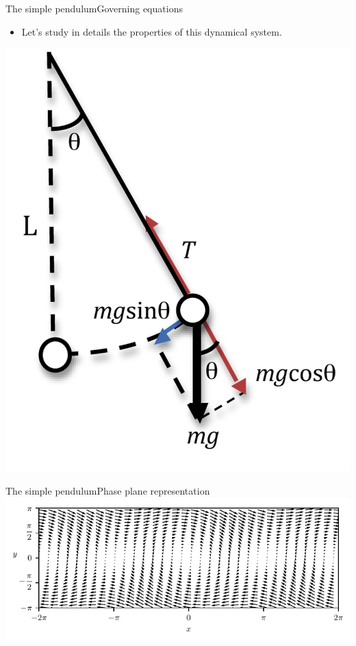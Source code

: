 \documentclass[usenames,dvipsnames,svgnames,10pt,aspectratio=169]{beamer}
\begin{document}
\begin{frame}[t, c]{The simple pendulum}{Governing equations}
\begin{minipage}{.68\textwidth}
\begin{itemize}
			\item Let's study in details the properties of this dynamical system.
		\end{itemize}
	\end{minipage}%
	\hfill
	\begin{minipage}{.28\textwidth}
		\centering
		\includegraphics[width=\textwidth]{pendulum_sketch}
	\end{minipage}

	\vspace{1cm}
\end{frame}

\begin{frame}[t, c]{The simple pendulum}{Phase plane representation}
	\centering
	\includegraphics[width=.8\textwidth]{pendulum_phase_plane}
\end{frame}
\end{document}
